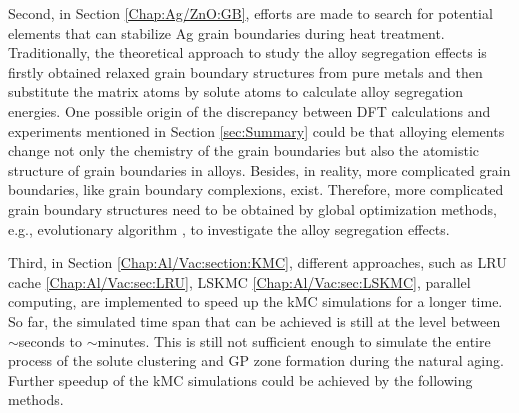 Second, in Section \ref{Chap:Ag/ZnO:GB}, efforts are made to search for potential elements that can stabilize Ag grain boundaries during heat treatment. Traditionally, the theoretical approach to study the alloy segregation effects is firstly obtained relaxed grain boundary structures from pure metals and then substitute the matrix atoms by solute atoms to calculate alloy segregation energies. One possible origin of the discrepancy between DFT calculations and experiments mentioned in Section \ref{sec:Summary} could be that alloying elements change not only the chemistry of the grain boundaries but also the atomistic structure of grain boundaries in alloys. Besides, in reality, more complicated grain boundaries, like grain boundary complexions, exist\cite{cantwell2014grain}. Therefore, more complicated grain boundary structures need to be obtained by global optimization methods, e.g., evolutionary algorithm \cite{yang2020grain}, to investigate the alloy segregation effects.

Third, in Section \ref{Chap:Al/Vac:section:KMC}, different approaches, such as \ac{LRU} cache \ref{Chap:Al/Vac:sec:LRU}, \ac{LSKMC} \ref{Chap:Al/Vac:sec:LSKMC}, parallel computing, are implemented to speed up the \ac{kMC} simulations for a longer time. So far, the simulated time span that can be achieved is still at the level between $\sim$seconds to $\sim$minutes. This is still not sufficient enough to simulate the entire process of the solute clustering and \ac{GP} zone formation during the natural aging. Further speedup of the \ac{kMC} simulations could be achieved by the following methods.

